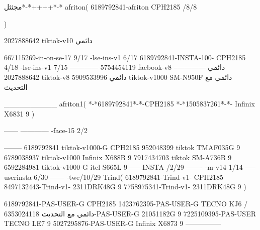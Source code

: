 مجثثل*-*++++*-*
afriton(
6189792841-afriton CPH2185  /8/8

)

2027888642 tiktok-v10
دائمي

667115269-in-on-se-17 9/17
-lse-ins-v1 6/17
6189792841-INSTA-100- CPH2185 4/18
-lse-ins-v1 7/15
------------
5754454119 facbook-v8
دائمي
--------------
2027888642 tiktok-v8
دائمي
5909533996 tiktok-v1000  SM-N950F
دائمي مع التحديث

__________
afriton1(
*-*6189792841*-*-CPH2185
*-*1505837261*-*-  Infinix X6831   9
)


------
------------
-face-15 2/2

--------
6189792841 tiktok-v1000-G CPH2185 
952048399 tiktok TMAF035G 9
6789038937 tiktok-v1000  Infinix X688B  9
7917434703 tiktok  SM-A736B  9
6592284981 tiktok-v1000-G  itel S665L  9
-----
 INSTA /2/29
-------
-m-v14 1/14
-----
userinsta 6/30
------
-twe/10/29
Trind(
6189792841-Trind-v1- CPH2185 
8497132443-Trind-v1- 2311DRK48G  9
7758975341-Trind-v1- 2311DRK48G  9
)


6189792841-PAS-USER-G CPH2185 
1423762395-PAS-USER-G TECNO KJ6  /دائمي مع التحديث
6353024118-PAS-USER-G   21051182G  9
7225109395-PAS-USER   TECNO LE7  9
5027295876-PAS-USER-G   Infinix X6873   9
    ---------------
